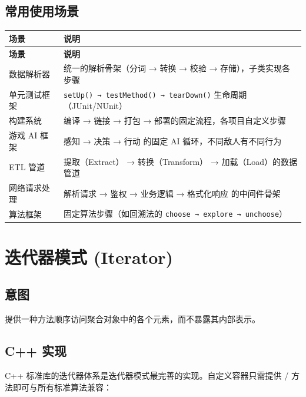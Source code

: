 \documentclass[12pt,a4paper,fontset=fandol]{ctexbook}
\begin{document}
\section{常用使用场景}

\begin{longtable}{p{4.5cm} p{8.5cm}}
\toprule
\textbf{场景} & \textbf{说明} \\
\midrule
\endfirsthead
\toprule
\textbf{场景} & \textbf{说明} \\
\midrule
\endhead
\bottomrule
\endfoot
数据解析器 & 统一的解析骨架（分词 → 转换 → 校验 → 存储），子类实现各步骤 \\
单元测试框架 & \texttt{setUp() → testMethod() → tearDown()} 生命周期（JUnit/NUnit） \\
构建系统 & 编译 → 链接 → 打包 → 部署的固定流程，各项目自定义步骤 \\
游戏 AI 框架 & 感知 → 决策 → 行动 的固定 AI 循环，不同敌人有不同行为 \\
ETL 管道 & 提取（Extract） → 转换（Transform） → 加载（Load）的数据管道 \\
网络请求处理 & 解析请求 → 鉴权 → 业务逻辑 → 格式化响应 的中间件骨架 \\
算法框架 & 固定算法步骤（如回溯法的 \texttt{choose → explore → unchoose}） \\
\end{longtable}

\chapter{迭代器模式 (Iterator)}

\section{意图}

提供一种方法顺序访问聚合对象中的各个元素，而不暴露其内部表示。

\section{C++ 实现}

C++ 标准库的迭代器体系是迭代器模式最完善的实现。自定义容器只需提供 \texttt{}/\allowbreak{}\texttt{} 方法即可与所有标准算法兼容：
\end{document}
